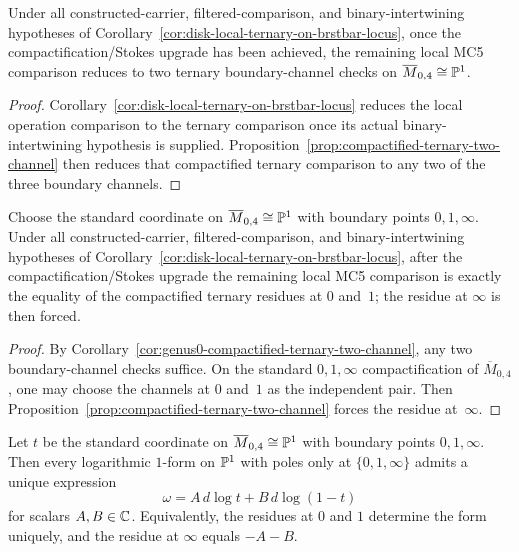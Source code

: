 \begin{corollary}
\label{cor:genus0-compactified-ternary-two-channel}
Under all constructed-carrier, filtered-comparison, and binary-intertwining hypotheses of Corollary~\ref{cor:disk-local-ternary-on-brstbar-locus}, once the compactification/Stokes
upgrade has been achieved, the remaining local MC5 comparison reduces
to two ternary boundary-channel checks on
$\overline{M}_{0,4} \cong \mathbb{P}^1$.
\end{corollary}

\begin{proof}
Corollary~\ref{cor:disk-local-ternary-on-brstbar-locus} reduces the
local operation comparison to the ternary comparison once its actual binary-intertwining hypothesis is supplied.  Proposition~\ref{prop:compactified-ternary-two-channel} then
reduces that compactified ternary comparison to any two of the three
boundary channels.
\end{proof}

\begin{corollary}
\label{cor:genus0-standard-chart-two-residues}
Choose the standard coordinate on
$\overline{M}_{0,4} \cong \mathbb{P}^1$ with boundary points
$0,1,\infty$.  Under all constructed-carrier, filtered-comparison, and binary-intertwining hypotheses of Corollary~\ref{cor:disk-local-ternary-on-brstbar-locus}, after the compactification/Stokes
upgrade the remaining local MC5 comparison is exactly the equality of
the compactified ternary residues at $0$ and~$1$; the residue at
$\infty$ is then forced.
\end{corollary}

\begin{proof}
By Corollary~\ref{cor:genus0-compactified-ternary-two-channel}, any two
boundary-channel checks suffice.  On the standard
$0,1,\infty$ compactification of $\overline{M}_{0,4}$, one may choose
the channels at $0$ and~$1$ as the independent pair.  Then
Proposition~\ref{prop:compactified-ternary-two-channel} forces the
residue at~$\infty$.
\end{proof}

\begin{proposition}
\label{prop:m04-standard-log-basis}
Let $t$ be the standard coordinate on
$\overline{M}_{0,4} \cong \mathbb{P}^1$ with boundary points
$0,1,\infty$.  Then every logarithmic $1$-form on
$\mathbb{P}^1$ with poles only at $\{0,1,\infty\}$ admits a unique
expression
\[
\omega = A\, d\log t + B\, d\log(1-t)
\]
for scalars $A,B \in \mathbb{C}$.
Equivalently, the residues at $0$ and $1$ determine the form
uniquely, and the residue at $\infty$ equals $-A-B$.
\end{proposition}


